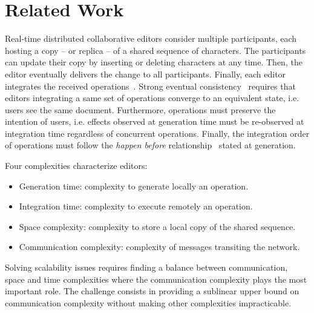 \section{Related Work}
\label{sec:relatedwork}

Real-time distributed collaborative editors consider multiple participants, each
hosting a copy -- or replica -- of a shared sequence of characters. The
participants can update their copy by inserting or deleting characters at any
time. Then, the editor eventually delivers the change to all
participants. Finally, each editor integrates the received
operations~\cite{saito2005optimistic}. Strong eventual
consistency~\cite{bailis2013eventual, shapiro2011comprehensive,
  sun1998achieving} requires that editors integrating a same set of operations
converge to an equivalent state, i.e. users see the same document. Furthermore,
operations must preserve the intention of users, i.e. effects observed at
generation time must be re-observed at integration time regardless of concurrent
operations. Finally, the integration order of operations must follow the
\emph{happen before} relationship~\cite{lamport1978time} stated at generation.

\noindent Four complexities characterize editors:
\begin{itemize}[noitemsep, leftmargin=*]
\item Generation time: complexity to generate locally an operation.
\item Integration time: complexity to execute remotely an operation.
\item Space complexity: complexity to store a local copy of the shared sequence.
\item Communication complexity: complexity of messages transiting the network.
\end{itemize}
Solving scalability issues requires finding a balance between communication,
space and time complexities %
where the communication complexity plays the most important role. The challenge
consists in providing a sublinear upper bound on communication complexity
without making other complexities impracticable.



